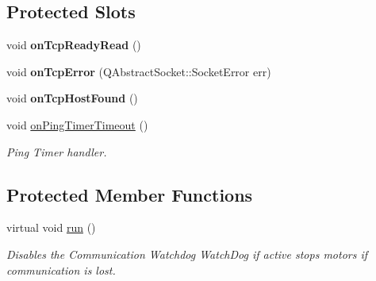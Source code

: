 \subsection*{Protected Slots}
\begin{DoxyCompactItemize}
\item 
\hypertarget{classroboctrl_1_1_robo_controller_s_d_k_a0e317d98289b546c8e4fd3a69bd8840a}{void {\bfseries on\-Tcp\-Ready\-Read} ()}\label{classroboctrl_1_1_robo_controller_s_d_k_a0e317d98289b546c8e4fd3a69bd8840a}

\item 
\hypertarget{classroboctrl_1_1_robo_controller_s_d_k_aa06a7496c69c9c286f96f3d82aef9bc3}{void {\bfseries on\-Tcp\-Error} (Q\-Abstract\-Socket\-::\-Socket\-Error err)}\label{classroboctrl_1_1_robo_controller_s_d_k_aa06a7496c69c9c286f96f3d82aef9bc3}

\item 
\hypertarget{classroboctrl_1_1_robo_controller_s_d_k_a541ff65ff5c39e696532fdb42bf3a166}{void {\bfseries on\-Tcp\-Host\-Found} ()}\label{classroboctrl_1_1_robo_controller_s_d_k_a541ff65ff5c39e696532fdb42bf3a166}

\item 
\hypertarget{classroboctrl_1_1_robo_controller_s_d_k_ac40bcdfb9f6c8780fdba2c7af428485c}{void \hyperlink{classroboctrl_1_1_robo_controller_s_d_k_ac40bcdfb9f6c8780fdba2c7af428485c}{on\-Ping\-Timer\-Timeout} ()}\label{classroboctrl_1_1_robo_controller_s_d_k_ac40bcdfb9f6c8780fdba2c7af428485c}

\begin{DoxyCompactList}\small\item\em Ping Timer handler. \end{DoxyCompactList}\end{DoxyCompactItemize}
\subsection*{Protected Member Functions}
\begin{DoxyCompactItemize}
\item 
virtual void \hyperlink{classroboctrl_1_1_robo_controller_s_d_k_a056d606543ec2a9ba9fd6f151776b72a}{run} ()
\begin{DoxyCompactList}\small\item\em Disables the Communication Watchdog Watch\-Dog if active stops motors if communication is lost. \end{DoxyCompactList}\end{DoxyCompactItemize}


